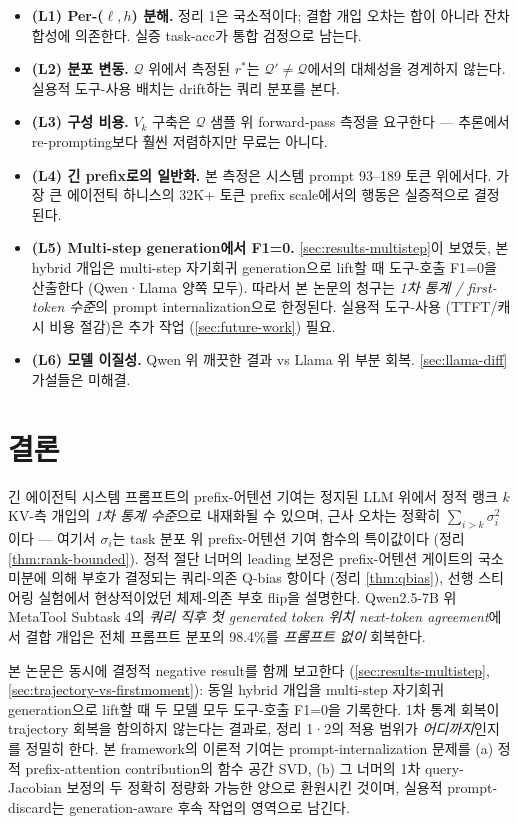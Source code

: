 \documentclass{article}
\theoremstyle{definition}
\begin{document}
\begin{itemize}[leftmargin=*, itemsep=2pt]
\item \textbf{(L1) Per-($\ell,h$) 분해.} 정리 1은 국소적이다; 결합 개입 오차는 합이 아니라 잔차 합성에 의존한다. 실증 task-acc가 통합 검정으로 남는다.
\item \textbf{(L2) 분포 변동.} $\mathcal{Q}$ 위에서 측정된 $r^*$는 $\mathcal{Q}' \ne \mathcal{Q}$에서의 대체성을 경계하지 않는다. 실용적 도구-사용 배치는 drift하는 쿼리 분포를 본다.
\item \textbf{(L3) 구성 비용.} $V_k$ 구축은 $\mathcal{Q}$ 샘플 위 forward-pass 측정을 요구한다 --- 추론에서 re-prompting보다 훨씬 저렴하지만 무료는 아니다.
\item \textbf{(L4) 긴 prefix로의 일반화.} 본 측정은 시스템 prompt 93--189 토큰 위에서다. 가장 큰 에이전틱 하니스의 32K+ 토큰 prefix scale에서의 행동은 실증적으로 결정된다.
\item \textbf{(L5) Multi-step generation에서 F1=0.} \cref{sec:results-multistep}이 보였듯, 본 hybrid 개입은 multi-step 자기회귀 generation으로 lift할 때 도구-호출 F1=0을 산출한다 (Qwen·Llama 양쪽 모두). 따라서 본 논문의 청구는 \emph{1차 통계 / first-token 수준}의 prompt internalization으로 한정된다. 실용적 도구-사용 (TTFT/캐시 비용 절감)은 추가 작업 (\cref{sec:future-work}) 필요.
\item \textbf{(L6) 모델 이질성.} Qwen 위 깨끗한 결과 vs Llama 위 부분 회복. \cref{sec:llama-diff} 가설들은 미해결.
\end{itemize}

\section{결론}
\label{sec:conclusion}

긴 에이전틱 시스템 프롬프트의 prefix-어텐션 기여는 정지된 LLM 위에서 정적 랭크 $k$ KV-측 개입의 \emph{1차 통계 수준}으로 내재화될 수 있으며, 근사 오차는 정확히 $\sum_{i>k}\sigma_i^2$이다 --- 여기서 $\sigma_i$는 task 분포 위 prefix-어텐션 기여 함수의 특이값이다 (정리 \ref{thm:rank-bounded}). 정적 절단 너머의 leading 보정은 prefix-어텐션 게이트의 국소 미분에 의해 부호가 결정되는 쿼리-의존 Q-bias 항이다 (정리 \ref{thm:qbias}), 선행 스티어링 실험에서 현상적이었던 체제-의존 부호 flip을 설명한다. Qwen2.5-7B 위 MetaTool Subtask 4의 \emph{쿼리 직후 첫 generated token 위치 next-token agreement}에서 결합 개입은 전체 프롬프트 분포의 98.4\%를 \emph{프롬프트 없이} 회복한다.

본 논문은 동시에 결정적 negative result를 함께 보고한다 (\cref{sec:results-multistep}, \cref{sec:trajectory-vs-firstmoment}): 동일 hybrid 개입을 multi-step 자기회귀 generation으로 lift할 때 두 모델 모두 도구-호출 F1=0을 기록한다. 1차 통계 회복이 trajectory 회복을 함의하지 않는다는 결과로, 정리 1·2의 적용 범위가 \emph{어디까지}인지를 정밀히 한다. 본 framework의 이론적 기여는 prompt-internalization 문제를 (a) 정적 prefix-attention contribution의 함수 공간 SVD, (b) 그 너머의 1차 query-Jacobian 보정의 두 정확히 정량화 가능한 양으로 환원시킨 것이며, 실용적 prompt-discard는 generation-aware 후속 작업의 영역으로 남긴다.
\end{document}
